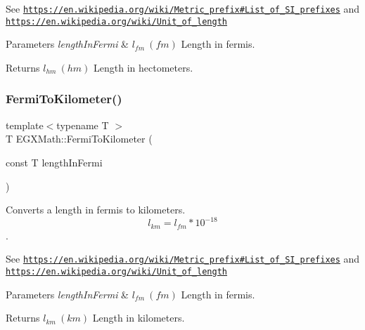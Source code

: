 See \href{https://en.wikipedia.org/wiki/Metric_prefix#List_of_SI_prefixes}{\tt https\+://en.\+wikipedia.\+org/wiki/\+Metric\+\_\+prefix\#\+List\+\_\+of\+\_\+\+S\+I\+\_\+prefixes} and \href{https://en.wikipedia.org/wiki/Unit_of_length}{\tt https\+://en.\+wikipedia.\+org/wiki/\+Unit\+\_\+of\+\_\+length} 
\begin{DoxyParams}{Parameters}
{\em length\+In\+Fermi} & $ l_{fm}\ (fm)$ Length in fermis. \\
\hline
\end{DoxyParams}
\begin{DoxyReturn}{Returns}
$ l_{hm}\ (hm)$ Length in hectometers. 
\end{DoxyReturn}
\mbox{\label{group___e_g_x_math-_conversions-_length_conversions-_non-_s_i-_fermi-_s_i_ga9401eb4ce5a32e0c67244eba800b1fd4}} 
\subsubsection{\texorpdfstring{Fermi\+To\+Kilometer()}{FermiToKilometer()}}
{\footnotesize\ttfamily template$<$typename T $>$ \\
T E\+G\+X\+Math\+::\+Fermi\+To\+Kilometer (\begin{DoxyParamCaption}\item[{const T}]{length\+In\+Fermi }\end{DoxyParamCaption})}



Converts a length in fermis to kilometers. \[ l_{km}=l_{fm} * 10^{-18} \]. 

See \href{https://en.wikipedia.org/wiki/Metric_prefix#List_of_SI_prefixes}{\tt https\+://en.\+wikipedia.\+org/wiki/\+Metric\+\_\+prefix\#\+List\+\_\+of\+\_\+\+S\+I\+\_\+prefixes} and \href{https://en.wikipedia.org/wiki/Unit_of_length}{\tt https\+://en.\+wikipedia.\+org/wiki/\+Unit\+\_\+of\+\_\+length} 
\begin{DoxyParams}{Parameters}
{\em length\+In\+Fermi} & $ l_{fm}\ (fm)$ Length in fermis. \\
\hline
\end{DoxyParams}
\begin{DoxyReturn}{Returns}
$ l_{km}\ (km)$ Length in kilometers. 
\end{DoxyReturn}
\mbox{\label{group___e_g_x_math-_conversions-_length_conversions-_non-_s_i-_fermi-_s_i_ga5a9bfb0faa55f320e61263103a17da64}} 
